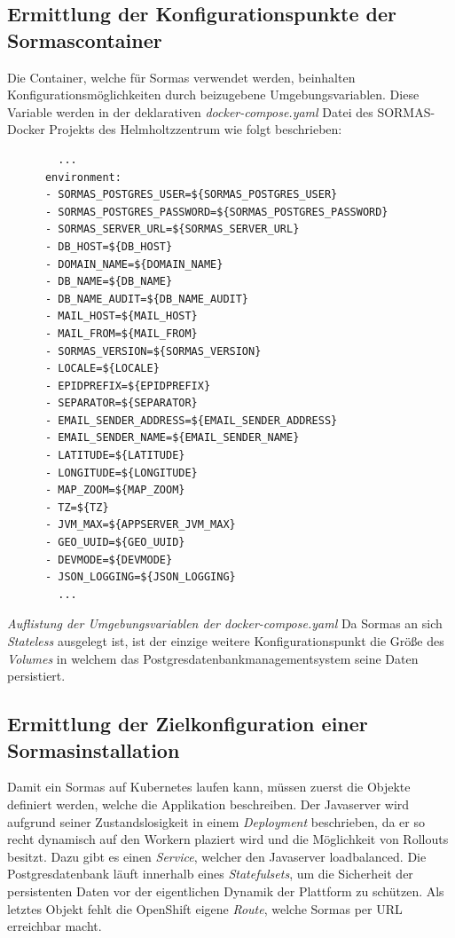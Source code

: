 \documentclass[a4paper,11pt]{article}
\begin{document}
    \subsection{Ermittlung der Konfigurationspunkte der Sormascontainer}
    Die Container, welche für Sormas verwendet werden, beinhalten Konfigurationsmöglichkeiten durch beizugebene Umgebungsvariablen.
    Diese Variable werden in der deklarativen \emph{docker-compose.yaml} Datei des SORMAS-Docker Projekts des Helmholtzzentrum wie folgt beschrieben:
    \begin{lstlisting}
        ...
      environment:
      - SORMAS_POSTGRES_USER=${SORMAS_POSTGRES_USER}
      - SORMAS_POSTGRES_PASSWORD=${SORMAS_POSTGRES_PASSWORD}
      - SORMAS_SERVER_URL=${SORMAS_SERVER_URL}
      - DB_HOST=${DB_HOST}
      - DOMAIN_NAME=${DOMAIN_NAME}
      - DB_NAME=${DB_NAME}
      - DB_NAME_AUDIT=${DB_NAME_AUDIT}
      - MAIL_HOST=${MAIL_HOST}
      - MAIL_FROM=${MAIL_FROM}
      - SORMAS_VERSION=${SORMAS_VERSION}
      - LOCALE=${LOCALE}
      - EPIDPREFIX=${EPIDPREFIX}
      - SEPARATOR=${SEPARATOR}
      - EMAIL_SENDER_ADDRESS=${EMAIL_SENDER_ADDRESS}
      - EMAIL_SENDER_NAME=${EMAIL_SENDER_NAME}
      - LATITUDE=${LATITUDE}
      - LONGITUDE=${LONGITUDE}
      - MAP_ZOOM=${MAP_ZOOM}
      - TZ=${TZ}
      - JVM_MAX=${APPSERVER_JVM_MAX}
      - GEO_UUID=${GEO_UUID}
      - DEVMODE=${DEVMODE}
      - JSON_LOGGING=${JSON_LOGGING}
        ...
    \end{lstlisting} 
    \emph{Auflistung der Umgebungsvariablen der docker-compose.yaml}
    Da Sormas an sich \emph{Stateless} ausgelegt ist, ist der einzige weitere Konfigurationspunkt
    die Größe des \emph{Volumes} in welchem  das Postgresdatenbankmanagementsystem seine Daten persistiert.
    \subsection{Ermittlung der Zielkonfiguration einer Sormasinstallation}
    Damit ein Sormas auf Kubernetes laufen kann, müssen zuerst die Objekte definiert werden, welche die Applikation beschreiben.
    Der Javaserver wird aufgrund seiner Zustandslosigkeit in einem \emph{Deployment} beschrieben, da er so recht dynamisch
    auf den Workern plaziert wird und die Möglichkeit von Rollouts besitzt.
    Dazu gibt es einen \emph{Service}, welcher den Javaserver loadbalanced.
    Die Postgresdatenbank läuft innerhalb eines \emph{Statefulsets}, um die Sicherheit der 
    persistenten Daten vor der eigentlichen Dynamik der Plattform zu schützen.
    Als letztes Objekt fehlt die OpenShift eigene \emph{Route}, welche Sormas per URL erreichbar macht.
\end{document}
